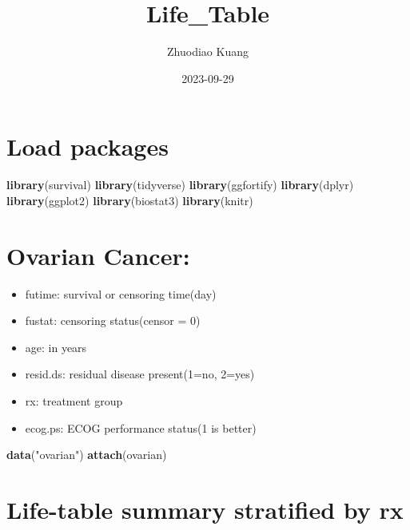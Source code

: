\documentclass[
]{article}
\title{Life\_Table}
\author{Zhuodiao Kuang}
\date{2023-09-29}
\newenvironment{Shaded}{\begin{snugshade}}{\end{snugshade}}
\newcommand{\FunctionTok}[1]{\textcolor[rgb]{0.13,0.29,0.53}{\textbf{#1}}}
\newcommand{\NormalTok}[1]{#1}
\newcommand{\StringTok}[1]{\textcolor[rgb]{0.31,0.60,0.02}{#1}}
\providecommand{\tightlist}{%
  \setlength{\itemsep}{0pt}\setlength{\parskip}{0pt}}
\begin{document}
\maketitle

\hypertarget{load-packages}{%
\section{Load packages}\label{load-packages}}

\begin{Shaded}
\begin{Highlighting}[]
\FunctionTok{library}\NormalTok{(survival)}
\FunctionTok{library}\NormalTok{(tidyverse)}
\FunctionTok{library}\NormalTok{(ggfortify)}
\FunctionTok{library}\NormalTok{(dplyr)}
\FunctionTok{library}\NormalTok{(ggplot2)}
\FunctionTok{library}\NormalTok{(biostat3)}
\FunctionTok{library}\NormalTok{(knitr)}
\end{Highlighting}
\end{Shaded}

\hypertarget{ovarian-cancer}{%
\section{Ovarian Cancer:}\label{ovarian-cancer}}

\begin{itemize}
\tightlist
\item
  futime: survival or censoring time(day)
\item
  fustat: censoring status(censor = 0)
\item
  age: in years
\item
  resid.ds: residual disease present(1=no, 2=yes)
\item
  rx: treatment group
\item
  ecog.ps: ECOG performance status(1 is better)
\end{itemize}

\begin{Shaded}
\begin{Highlighting}[]
\FunctionTok{data}\NormalTok{(}\StringTok{"ovarian"}\NormalTok{)}
\FunctionTok{attach}\NormalTok{(ovarian)}
\end{Highlighting}
\end{Shaded}

\hypertarget{life-table-summary-stratified-by-rx}{%
\section{Life-table summary stratified by
rx}\label{life-table-summary-stratified-by-rx}}
\end{document}
